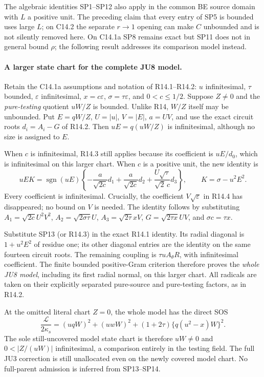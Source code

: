 The algebraic identities SP1--SP12 also apply in the common BE source
domain with $L$ a positive unit. The preceding claim that every entry
of SP5 is bounded uses large $L$; on C14.2 the separate $r\to1$
opening can make $C$ unbounded and is not silently removed here.
On C14.1a SP8 remains exact but SP11 does not in general bound
$\rho$; the following result addresses its comparison model instead.

\paragraph{A larger state chart for the complete JU8 model.}
Retain the C14.1a assumptions and notation of R14.1--R14.2:
$u$ infinitesimal, $\tau$ bounded, $\varepsilon$ infinitesimal,
$x=c\varepsilon$, $\sigma=\tau\varepsilon$, and $0<c\le1/2$.
Suppose $Z\ne0$ and the \emph{pure-testing} quotient
$uW/Z$ is bounded. Unlike R14, $W/Z$ itself may be unbounded.
Put $E=qW/Z$, $U=|u|$, $V=|E|$, $a=UV$, and use the exact
circuit roots $d_i=A_i-G$ of R14.2. Then $uE=q(uW/Z)$ is
infinitesimal, although no size is assigned to $E$.

When $c$ is infinitesimal, R14.3 still applies because its coefficient
is $uE/d_0$, which is infinitesimal on this larger chart.
When $c$ is a positive unit, the new identity is
\[
 uEK=\operatorname{sgn}(uE)\left\{
       -\frac{a}{\sqrt{2c}}d_1
       +\frac{a}{\sqrt{2c}}d_2
       +\frac{U\sqrt\tau}{\sqrt2\,c}d_3\right\},
 \qquad K=\sigma-u^2E^2.
 \tag{SP13}
\]
Every coefficient is infinitesimal. Crucially, the coefficient
$V\sqrt\varepsilon$ in R14.4 has disappeared; no bound on $V$ is
needed. The identity follows by substituting
$A_1=\sqrt{2c}U^2V^2$, $A_2=\sqrt{2\sigma\tau}U$,
$A_3=\sqrt{2\tau}xV$, $G=\sqrt{2\tau x}UV$,
and $\sigma c=\tau x$.

Substitute SP13 (or R14.3) in the exact R14.1 identity. Its radial
diagonal is $1+u^2E^2$ of residue one; its other diagonal entries
are the identity on the same fourteen circuit roots. The remaining
coupling is $\tau uA_\theta R$, with infinitesimal coefficient.
The finite bounded positive-Gram criterion therefore proves the
\emph{whole JU8 model}, including its first radial normal, on this
larger chart. All radicals are taken on their explicitly separated
pure-source and pure-testing factors, as in R14.2.

At the omitted literal chart $Z=0$, the whole model has the direct SOS
\[
 \frac{\mathcal L}{2\kappa_s}
   =(uqW)^2+(uwW)^2+(1+2\tau)\{q(u^2-x)W\}^2.
 \tag{SP14}
\]
The sole still-uncovered model state chart is therefore
$uW\ne0$ and $0<|Z/(uW)|$ infinitesimal, a comparison entirely in
the testing field. The full JU3 correction is still unallocated
even on the newly covered model chart. No full-parent admission is
inferred from SP13--SP14.


